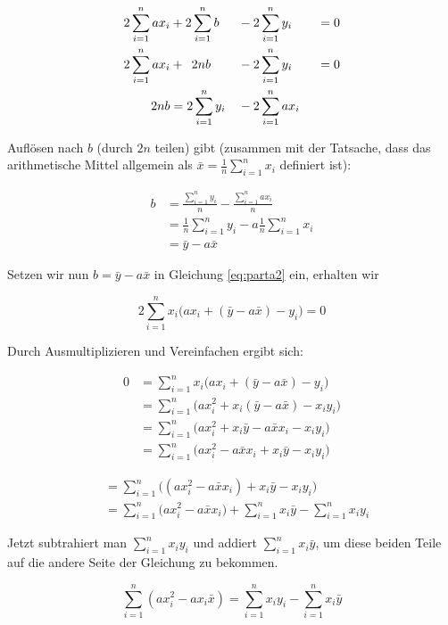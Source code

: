 \documentclass{scrartcl}
\def\sm{\sum\limits_{i=1}^{n}}
\begin{document}
\begin{alignat}{3}
2\sm ax_i &+ 2\sm b &&- 2 \sm y_i \quad &&= 0 \\
2\sm ax_i &+ \enskip 2nb &&- 2 \sm y_i \quad &&= 0 \\ 
2nb &= 2 \sm y_i &&- 2\sm ax_i && 
\end{alignat}

Auflösen nach $b$ (durch $2n$ teilen) gibt (zusammen mit der Tatsache, dass das arithmetische Mittel allgemein als $\bar{x}= \frac{1}{n} \sm x_i$ definiert ist):

\begin{align}
b &= \frac{\sm y_i}{n} - \frac{\sm ax_i}{n} \\
	&= \frac{1}{n} \sm y_i - a \frac{1}{n} \sm x_i \\
	&= \bar{y} - a \bar{x}
\end{align}

Setzen wir nun $b=\bar{y} - a \bar{x}$ in Gleichung \ref{eq:parta2} ein, erhalten wir

\begin{equation}
	2\sm x_i \big(ax_i + (\bar{y} - a \bar{x}) - y_i\big)=0
	\label{eq:einsetz}
\end{equation}

\clearpage Durch Ausmultiplizieren und Vereinfachen ergibt sich:

\begin{align}
0 &= 	\sm x_i \big(ax_i + (\bar{y} - a \bar{x}) - y_i\big) \\
	&= \sm \big(ax_i^2+x_i(\bar{y}-a\bar{x})-x_iy_i \big) \\
     &= \sm \big(ax_i^2 + x_i\bar{y} - a\bar{x}x_i- x_iy_i \big) \\
     &= \sm \big(ax_i^2 - a\bar{x}x_i + x_i\bar{y} - x_iy_i \big) 
\end{align}

\begin{align}
     &= \sm \big( (ax_i^2 - a\bar{x}x_i) + x_i\bar{y} - x_iy_i \big) \\
     &= \sm \big( ax_i^2 - a\bar{x}x_i \big) + \sm x_i\bar{y} - \sm x_iy_i 
\end{align}

Jetzt subtrahiert man $\sm x_iy_i$ und addiert $\sm x_i\bar{y}$, um diese beiden Teile auf die andere Seite der Gleichung zu bekommen.

\begin{equation}
\sm (ax_i^2 -ax_i\bar{x}) = \sm x_iy_i - \sm x_i\bar{y} 
\end{equation}
\end{document}
